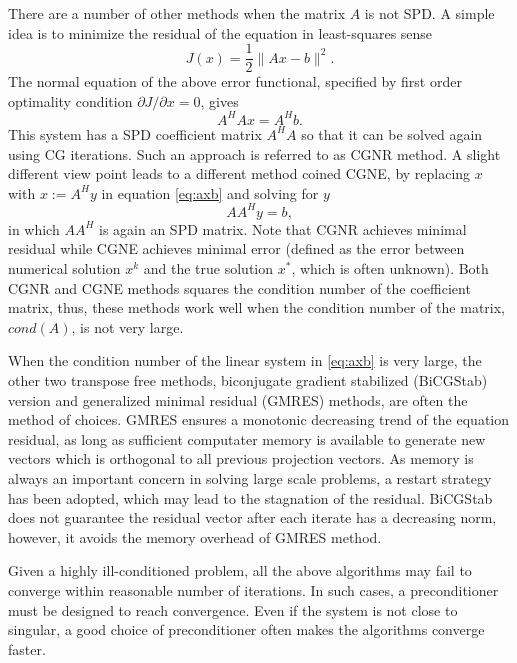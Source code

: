 \documentclass[10pt]{article}
\begin{document}
There are a number of other methods when the matrix $A$ is not SPD. A simple idea is to minimize the residual of the equation in least-squares sense
\begin{equation}
J(x)=\frac{1}{2}\|Ax-b\|^2.
\end{equation}
The normal equation of the above error functional, specified by first order optimality condition $\partial J/\partial x=0$, gives
\begin{equation}
A^H Ax = A^H b.
\end{equation}
This system has a SPD coefficient matrix $A^H A$ so that it can be solved again using CG iterations. Such an approach is referred to as CGNR method. A slight different view point leads to a different method coined CGNE, by replacing $x$ with $x:=A^Hy$ in equation \eqref{eq:axb} and solving for $y$
\begin{equation}
A A^H y= b,
\end{equation}
in which $A A^H$ is again an SPD matrix. Note that CGNR achieves minimal residual while CGNE achieves minimal error (defined as the error between numerical solution $x^k$ and the true solution $x^*$, which is often unknown). Both CGNR and CGNE methods squares the condition number of the coefficient matrix, thus, these methods work well when the condition number of the matrix, $cond(A)$, is not very large.


When the condition number of the linear system in \eqref{eq:axb} is very large, the other two transpose free methods, 
biconjugate gradient stabilized (BiCGStab) version \citep{van1992bicgstab,chen2016analysis} and generalized minimal residual (GMRES) \citep{Saad_1986_GMRES} methods, are often the method of choices. GMRES ensures a monotonic decreasing trend of the equation residual, as long as sufficient computater memory is available to generate new  vectors which is orthogonal to all previous projection vectors. As memory is always an important concern in solving large scale problems, a restart strategy has been adopted, which may lead to the stagnation of the residual.
BiCGStab does not guarantee the residual vector after each iterate has a decreasing norm, however, it avoids the memory overhead of GMRES method.

Given a highly ill-conditioned problem, all the above algorithms may fail to converge within reasonable number of iterations. In such cases, a preconditioner must be designed to reach convergence. Even if the system is not close to singular, a good choice of preconditioner often makes the algorithms converge faster.
\end{document}
